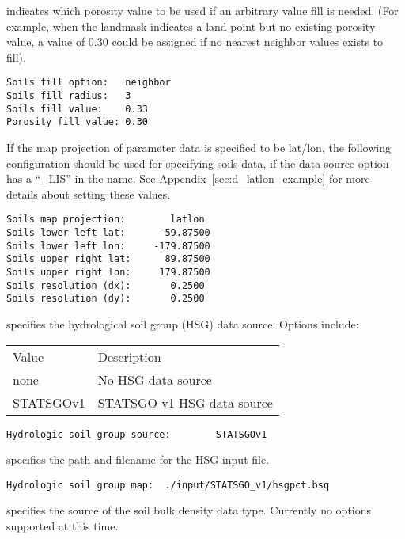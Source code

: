   indicates which porosity
 value to be used if an arbitrary value fill is needed. 
 (For example, when the landmask indicates a land point but no existing 
 porosity value, a value of 0.30 could be assigned if 
 no nearest neighbor values exists to fill).
 

 \begin{Verbatim}[frame=single]
Soils fill option:   neighbor 
Soils fill radius:   3
Soils fill value:    0.33
Porosity fill value: 0.30
 \end{Verbatim}

 
 If the map projection of parameter data is specified to be lat/lon,
 the following configuration should be used for specifying soils data,
 if the data source option has a ``\_LIS'' in the name.
 See Appendix~\ref{sec:d_latlon_example} for more details about
 setting these values.
 

 \begin{Verbatim}[frame=single]
Soils map projection:        latlon
Soils lower left lat:      -59.87500
Soils lower left lon:     -179.87500
Soils upper right lat:      89.87500
Soils upper right lon:     179.87500
Soils resolution (dx):       0.2500
Soils resolution (dy):       0.2500
 \end{Verbatim}

 
  specifies the 
 hydrological soil group (HSG) data source.
 Options include:

 \begin{tabular}{ll}
 Value   & Description                         \\
 none      & No HSG data source                \\
 STATSGOv1 & STATSGO v1 HSG data source        \\
 \end{tabular}
 

 \begin{Verbatim}[frame=single]
Hydrologic soil group source:        STATSGOv1
 \end{Verbatim}

 
  specifies the 
 path and filename for the HSG input file.
 

 \begin{Verbatim}[frame=single]
Hydrologic soil group map:  ./input/STATSGO_v1/hsgpct.bsq
 \end{Verbatim}

 
  specifies the
 source of the soil bulk density data type.
 Currently no options supported at this time.
 

